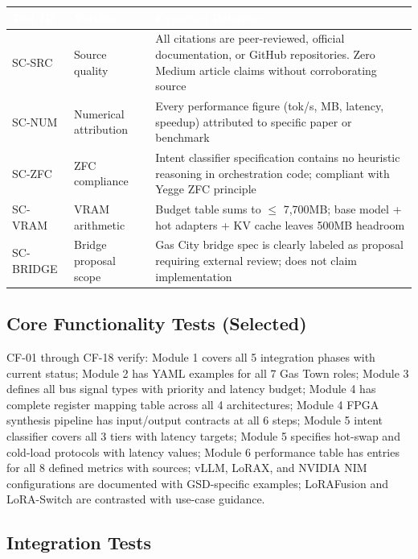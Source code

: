 \documentclass[11pt,letterpaper]{article}
\newcommand{\tableheader}[1]{\textbf{\sffamily\textcolor{white}{#1}}}
\begin{document}
\begin{center}
\begin{tabularx}{\textwidth}{C{1.5cm}L{4cm}X}
\toprule
{}
\tableheader{Test ID} & \tableheader{Verifies} & \tableheader{Expected Behavior} \\
\midrule
SC-SRC & Source quality & All citations are peer-reviewed, official documentation, or GitHub repositories. Zero Medium article claims without corroborating source \\
SC-NUM & Numerical attribution & Every performance figure (tok/s, MB, latency, speedup) attributed to specific paper or benchmark \\
SC-ZFC & ZFC compliance & Intent classifier specification contains no heuristic reasoning in orchestration code; compliant with Yegge ZFC principle \\
SC-VRAM & VRAM arithmetic & Budget table sums to $\leq$ 7,700MB; base model + hot adapters + KV cache leaves 500MB headroom \\
SC-BRIDGE & Bridge proposal scope & Gas City bridge spec is clearly labeled as proposal requiring external review; does not claim implementation \\
\bottomrule
\end{tabularx}
\end{center}

\subsection{Core Functionality Tests (Selected)}

CF-01 through CF-18 verify: Module 1 covers all 5 integration phases with current status; Module 2 has YAML examples for all 7 Gas Town roles; Module 3 defines all bus signal types with priority and latency budget; Module 4 has complete register mapping table across all 4 architectures; Module 4 FPGA synthesis pipeline has input/output contracts at all 6 steps; Module 5 intent classifier covers all 3 tiers with latency targets; Module 5 specifies hot-swap and cold-load protocols with latency values; Module 6 performance table has entries for all 8 defined metrics with sources; vLLM, LoRAX, and NVIDIA NIM configurations are documented with GSD-specific examples; LoRAFusion and LoRA-Switch are contrasted with use-case guidance.

\subsection{Integration Tests}
\end{document}
